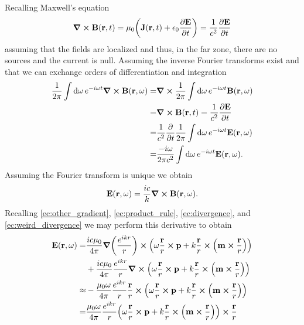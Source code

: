 \documentclass{article}
\begin{document}
\begin{enumerate}[(i)]
Recalling Maxwell's equation
\begin{equation}
\curl{\vb{B}}(\vb{r},t)=\mu_0\qty(\vb{J}(\vb{r},t)+\epsilon_0\pdv{\vb{E}}{t}(\vb{r},t))=\frac{1}{c^2}\pdv{\vb{E}}{t}(\vb{r},t)
\end{equation}
assuming that the fields are localized and thus, in the far zone, there are no sources and the current is null. Assuming the inverse Fourier transforms exist and that we can exchange orders of differentiation and integration
\begin{align}
\begin{split}
\frac{1}{2\pi}\int\dd{\omega}e^{-i\omega t}\curl{\vb{B}}(\vb{r},\omega)=&\curl\frac{1}{2\pi}\int\dd{\omega}e^{-i\omega t}\vb{B}(\vb{r},\omega)\\
=&\curl{\vb{B}}(\vb{r},t)=\frac{1}{c^2}\pdv{\vb{E}}{t}(\vb{r},t)\\
=&\frac{1}{c^2}\pdv{t}\frac{1}{2\pi}\int\dd{\omega}e^{-i\omega t}\vb{E}(\vb{r},\omega)\\
=&\frac{-i\omega}{2\pi c^2}\int\dd{\omega}e^{-i\omega t}\vb{E}(\vb{r},\omega).
\end{split}
\end{align}
Assuming the Fourier transform is unique we obtain
\begin{equation}
\vb{E}(\vb{r},\omega)=\frac{ic}{k}\curl{\vb{B}}(\vb{r},\omega).
\end{equation}
Recalling \eqref{ec:other_gradient}, \eqref{ec:product_rule}, \eqref{ec:divergence}, and \eqref{ec:weird_divergence} we may perform this derivative to obtain
\begin{align}
\begin{split}
\vb{E}(\vb{r},\omega)=&\frac{ic\mu_0}{4\pi}\grad(\frac{e^{ikr}}{r})\cross\qty(\omega\frac{\vb{r}}{r}\cross\vb{p}+k\frac{\vb{r}}{r}\cross\qty(\vb{m}\cross\frac{\vb{r}}{r}))\\
&+\frac{ic\mu_0}{4\pi}\frac{e^{ikr}}{r}\curl(\omega\frac{\vb{r}}{r}\cross\vb{p}+k\frac{\vb{r}}{r}\cross\qty(\vb{m}\cross\frac{\vb{r}}{r}))\\
\approx&-\frac{\mu_0\omega}{4\pi}\frac{e^{ikr}}{r}\frac{\vb{r}}{r}\cross\qty(\omega\frac{\vb{r}}{r}\cross\vb{p}+k\frac{\vb{r}}{r}\cross\qty(\vb{m}\cross\frac{\vb{r}}{r}))\\
=&\frac{\mu_0\omega}{4\pi}\frac{e^{ikr}}{r}\qty(\omega\frac{\vb{r}}{r}\cross\vb{p}+k\frac{\vb{r}}{r}\cross\qty(\vb{m}\cross\frac{\vb{r}}{r}))\cross\frac{\vb{r}}{r}\\
\end{split}
\end{align}

\end{enumerate}
\end{document}
